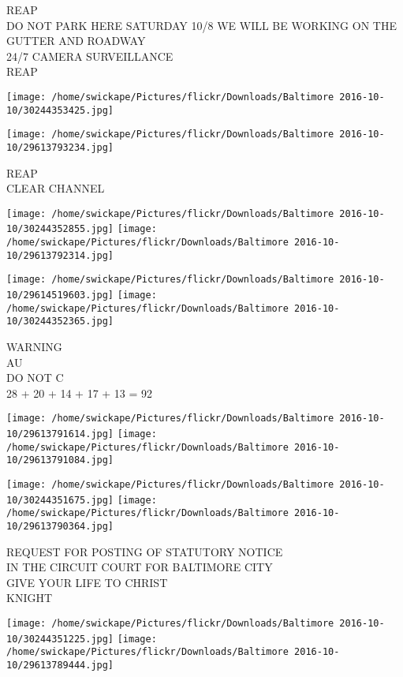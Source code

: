 \documentclass[10pt,letterpaper]{article}
\begin{document}
REAP\\
DO NOT PARK HERE SATURDAY 10/8 WE WILL BE WORKING ON THE GUTTER AND ROADWAY\\
24/7 CAMERA SURVEILLANCE\\
REAP
\pagebreak

\texttt{[image: /home/swickape/Pictures/flickr/Downloads/Baltimore 2016-10-10/30244353425.jpg]}

\vspace{0.25in}
\texttt{[image: /home/swickape/Pictures/flickr/Downloads/Baltimore 2016-10-10/29613793234.jpg]}

REAP\\
CLEAR CHANNEL
\pagebreak

\texttt{[image: /home/swickape/Pictures/flickr/Downloads/Baltimore 2016-10-10/30244352855.jpg]}
\texttt{[image: /home/swickape/Pictures/flickr/Downloads/Baltimore 2016-10-10/29613792314.jpg]}

\texttt{[image: /home/swickape/Pictures/flickr/Downloads/Baltimore 2016-10-10/29614519603.jpg]}
\texttt{[image: /home/swickape/Pictures/flickr/Downloads/Baltimore 2016-10-10/30244352365.jpg]}

WARNING\\
AU\\
DO NOT C\\
28 + 20 + 14 + 17 + 13 = 92
\pagebreak

\texttt{[image: /home/swickape/Pictures/flickr/Downloads/Baltimore 2016-10-10/29613791614.jpg]}
\texttt{[image: /home/swickape/Pictures/flickr/Downloads/Baltimore 2016-10-10/29613791084.jpg]}

\texttt{[image: /home/swickape/Pictures/flickr/Downloads/Baltimore 2016-10-10/30244351675.jpg]}
\texttt{[image: /home/swickape/Pictures/flickr/Downloads/Baltimore 2016-10-10/29613790364.jpg]}

REQUEST FOR POSTING OF STATUTORY NOTICE\\
IN THE CIRCUIT COURT FOR BALTIMORE CITY\\
GIVE YOUR LIFE TO CHRIST\\
KNIGHT
\pagebreak

\texttt{[image: /home/swickape/Pictures/flickr/Downloads/Baltimore 2016-10-10/30244351225.jpg]}
\texttt{[image: /home/swickape/Pictures/flickr/Downloads/Baltimore 2016-10-10/29613789444.jpg]}
\end{document}
